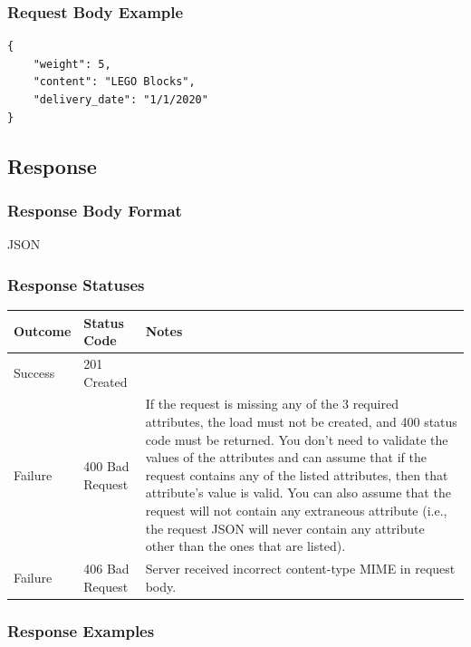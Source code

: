 \documentclass[letterpaper,11pt,titlepage,draftclsnofoot,onecolumn,compsoc,utf8,latin1]{IEEEtran}
\begin{document}
\begin{singlespace}
\subsubsection{Request Body Example}

\begin{lstlisting}[]
{
    "weight": 5,
    "content": "LEGO Blocks",
    "delivery_date": "1/1/2020"
}
\end{lstlisting}

\subsection{Response}
\subsubsection{Response Body Format}

JSON

\subsubsection{Response Statuses}

\begin{center}
\begin{tabular}{ |p{}|p{}|p{}| } 
 \hline
 \textbf{Outcome} & \textbf{Status Code} & \textbf{Notes}  \\  \hline
 Success & 201 Created &  \\ \hline
 Failure & 400 Bad Request &  
 If the request is missing any of the 3 required attributes, the load must not be created, and 400 status code must be returned.\vspace{.2cm}
 You don’t need to validate the values of the attributes and can assume that if the request contains any of the listed attributes, then that attribute’s value is valid.\vspace{.2cm}
 You can also assume that the request will not contain any extraneous attribute (i.e., the request JSON will never contain any attribute other than the ones that are listed).\\ \hline
  Failure & 406 Bad Request & Server received incorrect content-type MIME in request body. \\
 \hline
\end{tabular}
\end{center}

\subsubsection{Response Examples}


\end{singlespace}
\end{document}
